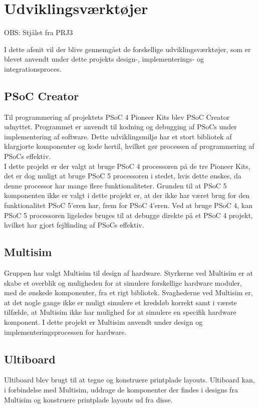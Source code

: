 \section{Udviklingsværktøjer}
\label{ch:Udviklingsvaerktoejer}

OBS: Stjålet fra PRJ3

I dette afsnit vil der blive gennemgået de forskellige udviklingsværktøjer, som er blevet anvendt under dette projekts design-, implementerings- og integrationsproces.

\subsection{PSoC Creator}
Til programmering af projektets PSoC 4 Pioneer Kits blev PSoC Creator udnyttet. Programmet er anvendt til kodning og debugging af PSoCs under implementering af software. Dette udviklingsmiljø har et stort bibliotek af klargjorte komponenter og kode hertil, hvilket gør processen af programmering af PSoCs effektiv.\\
I dette projekt er der valgt at bruge PSoC 4 processoren på de tre Pioneer Kits, det er dog muligt at bruge PSoC 5 processoren i stedet, hvis dette ønskes, da denne processor har mange flere funktionaliteter. Grunden til at PSoC 5 komponenten ikke er valgt i dette projekt er, at der ikke har været brug for den funktionalitet PSoC 5'eren har, frem for PSoC 4'eren. Ved at bruge PSoC 4, kan PSoC 5 processoren ligeledes bruges til at debugge direkte på et PSoC 4 projekt, hvilket har gjort fejlfinding af PSoCs effektiv.

\subsection{Multisim}
Gruppen har valgt Multisim til design af hardware. Styrkerne ved Multisim er at skabe et overblik og muligheden for at simulere forskellige hardware moduler, med de ønskede komponenter, fra et rigt bibliotek. Svaghederne ved Multisim er, at det nogle gange ikke er muligt simulere et kredsløb korrekt samt i værste tilfælde, at Multisim ikke har mulighed for at simulere en specifik hardware komponent. I dette projekt er Multisim anvendt under design og implementeringsprocessen for hardware.

\subsection{Ultiboard}
Ultiboard blev brugt til at tegne og konstruere printplade layouts. Ultiboard kan, i forbindelse med Multisim, uddrage de komponenter der findes i designs fra Multisim og konstruere printplade layouts ud fra disse.

